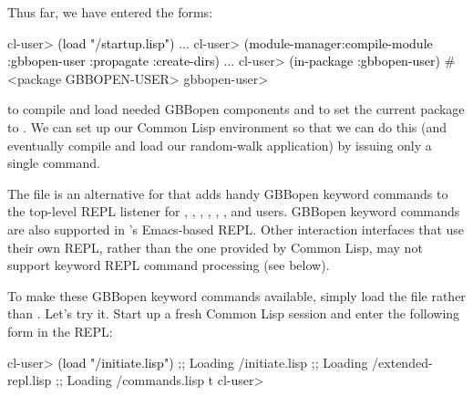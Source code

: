 \documentclass[10pt,twoside,english,pdftex]{article}
\begin{document}
Thus far, we have entered the forms:
%
\W\supp
\begin{example}
\textcolor{darkergray}{%
  cl-user> \textcolor{black}{(load "/startup.lisp")}
     ...
  cl-user> \textcolor{black}{(module-manager:compile-module :gbbopen-user :propagate :create-dirs)}
     ...
  cl-user> \textcolor{black}{(in-package :gbbopen-user)}
  #<package GBBOPEN-USER>
  gbbopen-user>}
\end{example}
%
to compile and load needed GBBopen components and to set the current package
to .  We can set up our Common Lisp environment so
that we can do this (and eventually compile and load our random-walk
application) by issuing only a single command.

The file  is an alternative
for  that adds handy GBBopen
keyword commands to the top-level REPL listener for , ,
,
,
,
,
 and  users.  GBBopen keyword commands are also
supported in 's
Emacs-based REPL.  Other interaction interfaces that use their own REPL,
rather than the one provided by Common Lisp, may not support keyword REPL
command processing (see below).

To make these GBBopen keyword commands available, simply load the file
 rather than
.  Let's try it.  Start up a
fresh Common Lisp session and enter the following form in the REPL:
%
\W\supp\notpretop
\begin{example}
\textcolor{darkergray}{%
  cl-user> \textcolor{black}{(load "/initiate.lisp")}
  ;; Loading /initiate.lisp
  ;;  Loading /extended-repl.lisp
  ;;  Loading /commands.lisp
  t
  cl-user>}
\end{example}
\end{document}
